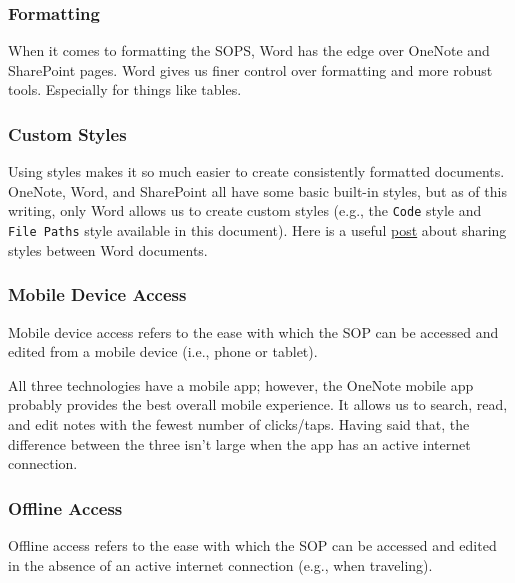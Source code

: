 \documentclass[
  letterpaper,
  DIV=11,
  numbers=noendperiod]{scrreprt}
\begin{document}
\subsubsection*{Formatting}\label{formatting}

When it comes to formatting the SOPS, Word has the edge over OneNote and
SharePoint pages. Word gives us finer control over formatting and more
robust tools. Especially for things like tables.

\subsubsection*{Custom Styles}\label{custom-styles}

Using styles makes it so much easier to create consistently formatted
documents. OneNote, Word, and SharePoint all have some basic built-in
styles, but as of this writing, only Word allows us to create custom
styles (e.g., the \texttt{Code} style and \texttt{File\ Paths} style
available in this document). Here is a useful
\href{https://answers.microsoft.com/en-us/msoffice/forum/all/copying-style-in-word-for-the-mac/c2487cc6-901b-40a1-a445-77c598da520f}{post}
about sharing styles between Word documents.

\subsubsection*{Mobile Device Access}\label{mobile-device-access}

Mobile device access refers to the ease with which the SOP can be
accessed and edited from a mobile device (i.e., phone or tablet).

All three technologies have a mobile app; however, the OneNote mobile
app probably provides the best overall mobile experience. It allows us
to search, read, and edit notes with the fewest number of clicks/taps.
Having said that, the difference between the three isn't large when the
app has an active internet connection.

\subsubsection*{Offline Access}\label{offline-access}

Offline access refers to the ease with which the SOP can be accessed and
edited in the absence of an active internet connection (e.g., when
traveling).
\end{document}
